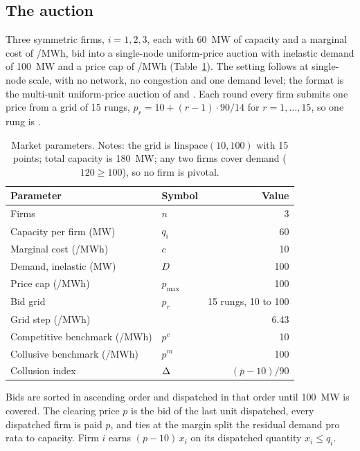 \subsection{The auction}\label{sec:market}

Three symmetric firms, $i = 1, 2, 3$, each with 60~MW of capacity and a marginal cost of /MWh, bid into a single-node uniform-price auction with inelastic demand of 100~MW and a price cap of /MWh (Table~\ref{tab:market}). The setting follows \citet{seredynski2026} at single-node scale, with no network, no congestion and one demand level; the format is the multi-unit uniform-price auction of \citet{vonderfehr1993} and \citet{fabra2006}. Each round every firm submits one price from a grid of 15 rungs, $p_r = 10 + (r-1)\cdot 90/14$ for $r = 1, \dots, 15$, so one rung is .

\begin{table}[t]
\caption{Market parameters. Notes: the grid is $\mathrm{linspace}(10, 100)$ with 15 points; total capacity is 180~MW; any two firms cover demand ($120 \geq 100$), so no firm is pivotal.}
\label{tab:market}
\centering
\small
\begin{tabular}{llr}
\toprule
Parameter & Symbol & Value \\
\midrule
Firms & $n$ & 3 \\
Capacity per firm (MW) & $q_i$ & 60 \\
Marginal cost (\eur{}/MWh) & $c$ & 10 \\
Demand, inelastic (MW) & $D$ & 100 \\
Price cap (\eur{}/MWh) & $p_{\max}$ & 100 \\
Bid grid & $p_r$ & 15 rungs, 10 to 100 \\
Grid step (\eur{}/MWh) & & 6.43 \\
Competitive benchmark (\eur{}/MWh) & $p^{c}$ & 10 \\
Collusive benchmark (\eur{}/MWh) & $p^{m}$ & 100 \\
Collusion index & $\Delta$ & $(\bar p - 10)/90$ \\
\bottomrule
\end{tabular}
\end{table}

Bids are sorted in ascending order and dispatched in that order until 100~MW is covered. The clearing price $p$ is the bid of the last unit dispatched, every dispatched firm is paid $p$, and ties at the margin split the residual demand pro rata to capacity. Firm $i$ earns $(p - 10)\,x_i$ on its dispatched quantity $x_i \le q_i$.


